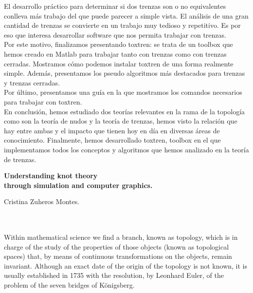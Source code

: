 El desarrollo práctico para determinar si dos trenzas son o no equivalentes conlleva más trabajo del que puede parecer a simple vista. El análisis de una gran cantidad de trenzas se convierte en un trabajo muy tedioso y repetitivo. Es por eso que interesa desarrollar software que nos permita trabajar con trenzas. \\

Por este motivo, finalizamos presentando toxtren: se trata de un toolbox que hemos creado en Matlab para trabajar tanto con trenzas como con trenzas cerradas. Mostramos cómo podemos instalar toxtren de una forma realmente simple. Además, presentamos los pseudo algoritmos más destacados para trenzas y trenzas cerradas.\\
Por último, presentamos una guía en la que mostramos los comandos necesarios para trabajar con toxtren. \\

En conclusión, hemos estudiado dos teorías relevantes en la rama de la topología como son la teoría de nudos y la teoría de trenzas, hemos visto la relación que hay entre ambas y el impacto que tienen hoy en día en diversas áreas de conocimiento. Finalmente, hemos desarrollado toxtren, toolbox en el que implementamos todos los conceptos y algoritmos que hemos analizado en la teoría de trenzas. 

 
\cleardoublepage


\thispagestyle{empty}

\begin{center}
{\large\bfseries Understanding knot theory \\
	through simulation and computer graphics.}\\
\end{center}
\begin{center}
Cristina Zuheros Montes.\\
\end{center}

\\

\vspace{0.7cm}
\\
Within mathematical science we find a branch, known as topology, which is in charge of the study of the properties of those objects (known as topological spaces) that, by means of continuous transformations on the objects, remain invariant. Although an exact date of the origin of the topology is not known, it is usually established in 1735 with the resolution, by Leonhard Euler, of the problem of the seven bridges of Königsberg.\\


